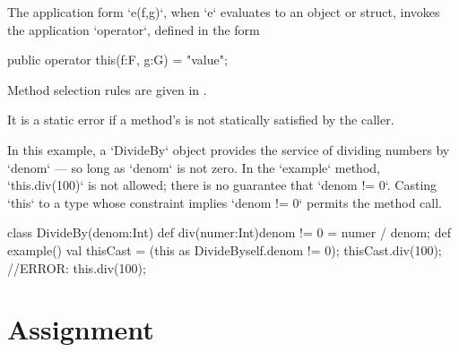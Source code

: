 The application form \xcd`e(f,g)`, when \xcd`e` evaluates to an object or
struct, invokes the application \xcd`operator`, 
defined in the form 
\begin{xten}
public operator this(f:F, g:G) = "value";
\end{xten}


Method selection rules are given in .

It is a static error if a method's  is not statically
satisfied by the 
caller.  

\begin{ex}
In this example, a \xcd`DivideBy` object provides the service of dividing
numbers by \xcd`denom` --- so long as \xcd`denom` is not zero. 
In the \xcd`example` method, \xcd`this.div(100)`  is not allowed; there is no
guarantee that \xcd`denom != 0`.  Casting \xcd`this` to a type 
whose constraint implies \xcd`denom != 0` permits the method call.
\begin{xten}
class DivideBy(denom:Int) {
  def div(numer:Int){denom != 0} = numer / denom;
  def example() {
     val thisCast = (this as DivideBy{self.denom != 0});
     thisCast.div(100);
     //ERROR: this.div(100); 
  }
}
\end{xten}
\end{ex}

\section{Assignment}\label{AssignmentStatement}

